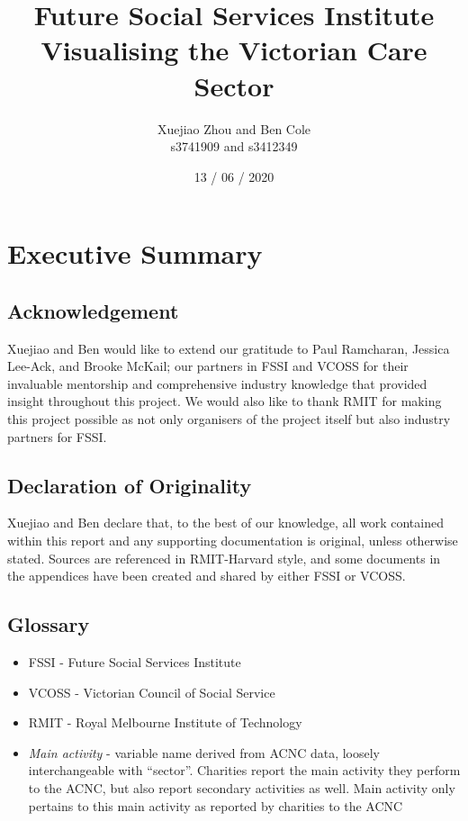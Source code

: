 \documentclass[
  11pt,
]{article}
\title{Future Social Services Institute\\
Visualising the Victorian Care Sector}
\author{Xuejiao Zhou and Ben Cole\\
s3741909 and s3412349}
\date{13 / 06 / 2020}
\providecommand{\tightlist}{%
  \setlength{\itemsep}{0pt}\setlength{\parskip}{0pt}}
\begin{document}
\maketitle

{
\setcounter{tocdepth}{2}
\tableofcontents
}
\newpage
{}

\hypertarget{executive-summary}{%
\section*{Executive Summary}\label{executive-summary}}

\hypertarget{acknowledgement}{%
\subsection*{Acknowledgement}\label{acknowledgement}}

Xuejiao and Ben would like to extend our gratitude to Paul Ramcharan, Jessica Lee-Ack, and Brooke McKail; our partners in FSSI and VCOSS for their invaluable mentorship and comprehensive industry knowledge that provided insight throughout this project. We would also like to thank RMIT for making this project possible as not only organisers of the project itself but also industry partners for FSSI.

\hypertarget{declaration-of-originality}{%
\subsection*{Declaration of Originality}\label{declaration-of-originality}}

Xuejiao and Ben declare that, to the best of our knowledge, all work contained within this report and any supporting documentation is original, unless otherwise stated. Sources are referenced in RMIT-Harvard style, and some documents in the appendices have been created and shared by either FSSI or VCOSS.

\hypertarget{glossary}{%
\subsection*{Glossary}\label{glossary}}

\begin{itemize}
\tightlist
\item
  FSSI - Future Social Services Institute
\item
  VCOSS - Victorian Council of Social Service
\item
  RMIT - Royal Melbourne Institute of Technology
\item
  \emph{Main activity} - variable name derived from ACNC data, loosely interchangeable with ``sector''. Charities report the main activity they perform to the ACNC, but also report secondary activities as well. Main activity only pertains to this main activity as reported by charities to the ACNC
\end{itemize}
\end{document}
